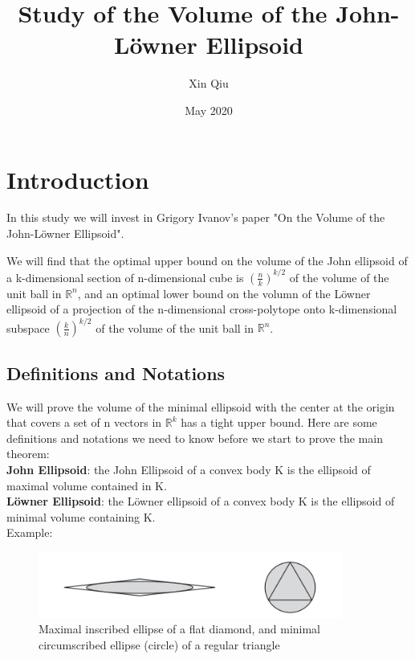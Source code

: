 \documentclass[fontsize=12pt,a4paper]{article}
\title{Study of the Volume of the John-Löwner Ellipsoid}
\author{Xin Qiu }
\date{May 2020}
\begin{document}
\maketitle

\section{Introduction}

In this study we will invest in Grigory Ivanov's paper "On the Volume of the John-Löwner Ellipsoid".

We will find that the optimal upper bound on the volume of the John ellipsoid of a k-dimensional section of n-dimensional cube is $(\frac{n}{k})^{k/2}$ of the volume of the unit ball in $ \mathbb{R}^n$, and an optimal lower bound on the volumn of the Löwner ellipsoid of a projection of the n-dimensional cross-polytope onto k-dimensional subspace $(\frac{k}{n})^{k/2}$ of the volume of the unit ball in $ \mathbb{R}^n$.

\subsection{Definitions and Notations}
We will prove the volume of the minimal ellipsoid with the center at the origin that covers a set of n vectors in $\mathbb{R}^k$ has a tight upper bound. Here are some definitions and notations we need to know before we start to prove the main theorem:\\

\textbf{John Ellipsoid}: the John Ellipsoid of a convex body K is the ellipsoid of maximal volume contained in K.\\

\textbf{Löwner Ellipsoid}: the Löwner ellipsoid of a convex body K is the ellipsoid of minimal volume containing K.\\

Example:
\begin{figure}[!htb]
\centering
  \includegraphics[width=10cm,height = 4 cm]{J-L.PNG}
  \caption{Maximal inscribed ellipse of a flat diamond, and minimal circumscribed ellipse (circle) of a regular triangle}
\end{figure}
\end{document}
